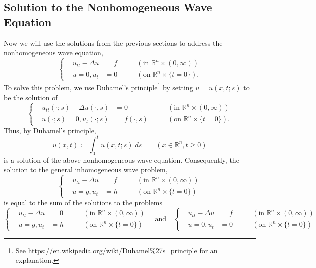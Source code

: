 \documentclass{article}
\begin{document}
\subsection{Solution to the Nonhomogeneous Wave Equation}
Now we will use the solutions from the previous sections to address the nonhomogeneous wave equation, 
\begin{equation}
	\left\{
	\begin{alignedat}{3}
		&u_{tt} - \Delta u &= f &\qquad (\text{in $\mathbb{R}^{n} \times (0,\infty)$}) \\
		&u =0, u_{t} &= 0 &\qquad (\text{on $\mathbb{R}^{n} \times \{t = 0\}$}). 
	\end{alignedat}
	\right.
\end{equation}
To solve this problem, we use Duhamel's principle\footnote{See \href{https://en.wikipedia.org/wiki/Duhamel\%27s\_principle}{https://en.wikipedia.org/wiki/Duhamel\%27s\_principle} for an explanation.} by setting $u = u(x,t;s)$ to be the solution of 
\begin{equation}
	\left\{
	\begin{alignedat}{3}
		&u_{tt}(\cdot; s)- \Delta u(\cdot, s) &= 0 \qquad &(\text{in $\mathbb{R}^{n} \times (0,\infty)$}) \\
		&u(\cdot;s) =0, u_{t}(\cdot;s) &= f(\cdot,s) \qquad &(\text{on $\mathbb{R}^{n} \times \{t = 0\}$}). 
	\end{alignedat}
	\right.
\end{equation}
Thus, by Duhamel's principle, 
\begin{equation}
	u(x, t) \coloneqq \int_{0}^{t}u(x,t;s)\;ds \qquad (x \in \mathbb{R}^n, t \geq 0)
\end{equation}
is a solution of the above nonhomogeneous wave equation. Consequently, the solution to the general inhomogeneous wave problem, 
\begin{equation}
	\left\{
	\begin{alignedat}{3}
		&u_{tt} - \Delta u &= f &\qquad(\text{in $\mathbb{R}^n \times (0,\infty)$}) \\
		&u = g, u_t &=h &\qquad (\text{on $\mathbb{R}^n \times \{t = 0\}$})
	\end{alignedat}
	\right.
\end{equation}
is equal to the sum of the solutions to the problems
\begin{equation}
	\left\{
	\begin{alignedat}{3}
		&u_{tt} - \Delta u &= 0 &\qquad(\text{in $\mathbb{R}^n \times (0,\infty)$}) \\
		&u = g, u_t &=h &\qquad (\text{on $\mathbb{R}^n \times \{t = 0\}$})
	\end{alignedat}
	\right.
	\quad 
	\text{and} 
	\quad 
	\left\{
	\begin{alignedat}{3}
		&u_{tt} - \Delta u &= f &\qquad(\text{in $\mathbb{R}^n \times (0,\infty)$}) \\
		&u = 0, u_t &=0 &\qquad (\text{on $\mathbb{R}^n \times \{t = 0\}$})
	\end{alignedat}
	\right.
\end{equation}
\end{document}
